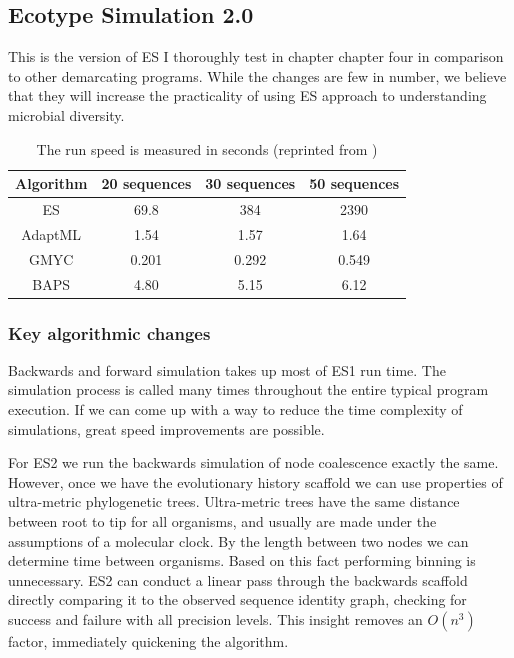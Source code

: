 \subsection*{Ecotype Simulation 2.0}
This is the version of ES I thoroughly test in chapter chapter four in comparison to other demarcating programs.
While the changes are few in number, we believe that they will increase the practicality of using ES approach to understanding microbial diversity.

\begin{table}
 \begin{tabular}{| c | c | c | c |}
  \hline
  Algorithm & 20 sequences & 30 sequences & 50 sequences \\ \hline
  ES & 69.8 & 384 & 2390 \\
  AdaptML & 1.54 & 1.57 & 1.64 \\
  GMYC & 0.201 & 0.292 & 0.549 \\
  BAPS & 4.80 & 5.15 & 6.12 \\
  \hline
 \end{tabular}
 \caption[ES1 run-time compared to other demarcation programs.]{The run speed is measured in seconds (reprinted from \protect\cite{carlo})}
 \label{tab:ES1speed}
\end{table}

\subsubsection*{Key algorithmic changes}
Backwards and forward simulation takes up most of ES1 run time.
The simulation process is called many times throughout the entire typical program execution.
If we can come up with a way to reduce the time complexity of simulations, great speed improvements are possible.

For ES2 we run the backwards simulation of node coalescence exactly the same.
However, once we have the evolutionary history scaffold we can use properties of ultra-metric phylogenetic trees.
Ultra-metric trees have the same distance between root to tip for all organisms, and usually are made under the assumptions of a molecular clock.
By the length between two nodes we can determine time between organisms.
Based on this fact performing binning is unnecessary.
ES2 can conduct a linear pass through the backwards scaffold directly comparing it to the observed sequence identity graph, checking for success and failure with all precision levels.
This insight removes an $O(n^3)$ factor, immediately quickening the algorithm.

